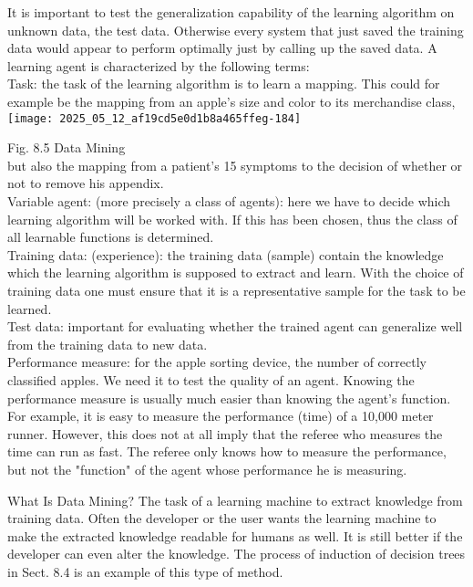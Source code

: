 \documentclass[10pt]{article}
\begin{document}
It is important to test the generalization capability of the learning algorithm on unknown data, the test data. Otherwise every system that just saved the training data would appear to perform optimally just by calling up the saved data. A learning agent is characterized by the following terms:\\
Task: the task of the learning algorithm is to learn a mapping. This could for example be the mapping from an apple's size and color to its merchandise class,\\
\texttt{[image: 2025\_05\_12\_af19cd5e0d1b8a465ffeg-184]}

Fig. 8.5 Data Mining\\
but also the mapping from a patient's 15 symptoms to the decision of whether or not to remove his appendix.\\
Variable agent: (more precisely a class of agents): here we have to decide which learning algorithm will be worked with. If this has been chosen, thus the class of all learnable functions is determined.\\
Training data: (experience): the training data (sample) contain the knowledge which the learning algorithm is supposed to extract and learn. With the choice of training data one must ensure that it is a representative sample for the task to be learned.\\
Test data: important for evaluating whether the trained agent can generalize well from the training data to new data.\\
Performance measure: for the apple sorting device, the number of correctly classified apples. We need it to test the quality of an agent. Knowing the performance measure is usually much easier than knowing the agent's function. For example, it is easy to measure the performance (time) of a 10,000 meter runner. However, this does not at all imply that the referee who measures the time can run as fast. The referee only knows how to measure the performance, but not the "function" of the agent whose performance he is measuring.

What Is Data Mining? The task of a learning machine to extract knowledge from training data. Often the developer or the user wants the learning machine to make the extracted knowledge readable for humans as well. It is still better if the\\
developer can even alter the knowledge. The process of induction of decision trees in Sect. 8.4 is an example of this type of method.
\end{document}
